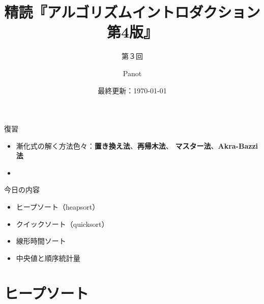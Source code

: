\documentclass[unicode,11pt,aspectratio=169,notes]{beamer} %
\title{精読『アルゴリズムイントロダクション 第4版』}
\subtitle{第３回}
\author{Panot}
\date{最終更新：\today}
\begin{document}
\begin{frame}
  \titlepage{}
\end{frame}

\begin{frame}{復習}
  \begin{itemize}
    \item 漸化式の解く方法色々：\textbf{置き換え法}、\textbf{再帰木法}、
    \textbf{マスター法}、\textbf{Akra-Bazzi 法}
    \item 
  \end{itemize}
\end{frame}

\begin{frame}{今日の内容}
  \begin{itemize}
    \item ヒープソート（heapsort）
    \item クイックソート（quicksort）
    \item 線形時間ソート
    \item 中央値と順序統計量
  \end{itemize}
\end{frame}

\section*{ヒープソート}

\begin{frame}
  \sectionpage{}
\end{frame}
\end{document}
